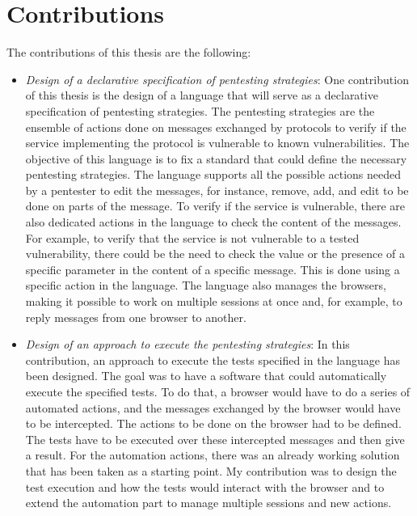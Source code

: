\section{Contributions}
\label{sec:contributions}
The contributions of this thesis are the following:
\begin{itemize}
    \item \textit{Design of a declarative specification of pentesting strategies}: One contribution of this thesis is the design of a language that will serve as a declarative specification of pentesting strategies. The pentesting strategies are the ensemble of actions done on messages exchanged by protocols to verify if the service implementing the protocol is vulnerable to known vulnerabilities. The objective of this language is to fix a standard that could define the necessary pentesting strategies. The language supports all the possible actions needed by a pentester to edit the messages, for instance, remove, add, and edit to be done on parts of the message. To verify if the service is vulnerable, there are also dedicated actions in the language to check the content of the messages. For example, to verify that the service is not vulnerable to a tested vulnerability, there could be the need to check the value or the presence of a specific parameter in the content of a specific message. This is done using a specific action in the language. The language also manages the browsers, making it possible to work on multiple sessions at once and, for example, to reply messages from one browser to another.
    \item \textit{Design of an approach to execute the pentesting strategies}: In this contribution, an approach to execute the tests specified in the language has been designed. The goal was to have a software that could automatically execute the specified tests. To do that, a browser would have to do a series of automated actions, and the messages exchanged by the browser would have to be intercepted. The actions to be done on the browser had to be defined. The tests have to be executed over these intercepted messages and then give a result. For the automation actions, there was an already working solution \cite{wendy_barreto, claudio_grisenti} that has been taken as a starting point. My contribution was to design the test execution and how the tests would interact with the browser and to extend the automation part to manage multiple sessions and new actions.

\end{itemize}
